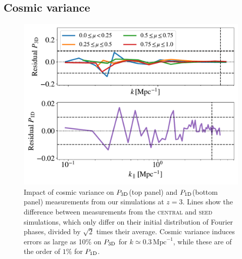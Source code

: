 \documentclass[longauth]{aa}
\newcommand{\poned}{\ensuremath{P_{\rm 1D}}\xspace}
\newcommand{\pthreed}{\ensuremath{P_{\rm 3D}}\xspace}
\newcommand{\simseed}{\textsc{seed}\xspace}
\newcommand{\simcentral}{\textsc{central}\xspace}
\newcommand{\iMpc}{\ensuremath{\,\mathrm{Mpc}^{-1}}}
\begin{document}




\begin{appendix}


\section{Cosmic variance}
\label{sec:cosmic_variance}

\begin{figure}
    \centering\includegraphics[width=\columnwidth]{figures/cvariance_z_3.0.pdf}
    \caption{Impact of cosmic variance on \pthreed (top panel) and \poned (bottom panel) measurements from our simulations at $z=3$. Lines show the difference between measurements from the \simcentral and \simseed simulations, which only differ on their initial distribution of Fourier phases, divided by $\sqrt{2}$ times their average. Cosmic variance induces errors as large as 10\% on \pthreed for $k\simeq0.3\iMpc$, while these are of the order of $1\%$ for \poned.}
    \label{fig:cvar}
\end{figure}



\end{appendix}
\end{document}
